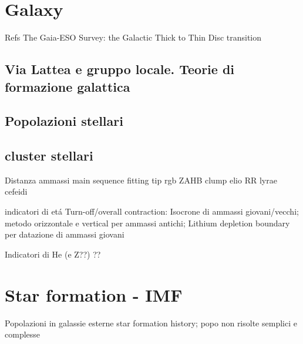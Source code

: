 \section{Galaxy}

\begin{frame}{Refs}
The Gaia-ESO Survey: the Galactic Thick to Thin Disc transition
\end{frame}

\subsection{Via Lattea e gruppo locale. Teorie di formazione galattica}

\subsection{Popolazioni stellari}

\subsection{cluster stellari}

\begin{frame}{Distanza ammassi}
main sequence fitting
tip rgb
ZAHB
clump elio
RR lyrae
cefeidi
\end{frame}

\begin{frame}{indicatori di et\'a}
Turn-off/overall contraction: Isocrone di ammassi giovani/vecchi; metodo orizzontale e vertical per ammassi antichi; Lithium depletion boundary per datazione di ammassi giovani
\end{frame}

\begin{frame}{Indicatori di He (e Z??)}
??
\end{frame}

\section{Star formation - IMF}

\begin{frame}{Popolazioni in galassie esterne}
star formation history; popo non risolte semplici e complesse
\end{frame}